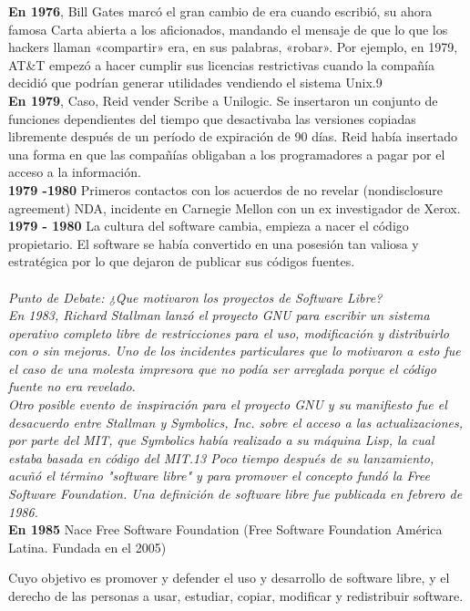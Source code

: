 \documentclass{book}
\begin{document}
{\bf En 1976}, Bill Gates marcó el gran cambio de era cuando escribió, su ahora famosa Carta abierta a los aficionados, mandando el mensaje de que lo que los hackers llaman «compartir» era, en sus palabras, «robar». Por ejemplo, en 1979, AT\&T empezó a hacer cumplir sus licencias restrictivas cuando la compañía decidió que podrían generar utilidades vendiendo el sistema Unix.9
\\
{\bf En 1979}, Caso, Reid vender Scribe a Unilogic. Se insertaron un conjunto de funciones dependientes del tiempo que desactivaba las versiones copiadas libremente después de un período de expiración de 90 días.
Reid había insertado una forma en que las compañías obligaban a los programadores a pagar por el acceso a la información.
\\
{\bf 1979 -1980} Primeros contactos con los acuerdos de no revelar (nondisclosure agreement) NDA, incidente en Carnegie Mellon con un ex investigador de Xerox.
\\
{\bf 1979 - 1980} La cultura del software cambia, empieza a nacer el código propietario.
El software se había convertido en una posesión tan valiosa y estratégica por lo que dejaron de publicar sus códigos fuentes.
\\
\\
{\it Punto de Debate: ¿Que motivaron los proyectos de Software Libre?
\\
En 1983, Richard Stallman lanzó el proyecto GNU para escribir un sistema operativo completo libre de restricciones para el uso, modificación y distribuirlo con o sin mejoras. Uno de los incidentes particulares que lo motivaron a esto fue el caso de una molesta impresora que no podía ser arreglada porque el código fuente no era revelado.
\\
Otro posible evento de inspiración para el proyecto GNU y su manifiesto fue el desacuerdo entre Stallman y Symbolics, Inc. sobre el acceso a las actualizaciones, por parte del MIT, que Symbolics había realizado a su máquina Lisp, la cual estaba basada en código del MIT.13 Poco tiempo después de su lanzamiento, acuñó el término "software libre" y para promover el concepto fundó la Free Software Foundation.
Una definición de software libre fue publicada en febrero de 1986.
}
\\
{\bf En 1985} Nace Free Software Foundation (Free Software Foundation América Latina. Fundada en el 2005)

Cuyo objetivo es promover y defender el uso y desarrollo de software libre, y el derecho de las personas a usar, estudiar, copiar, modificar y redistribuir software.
\end{document}
